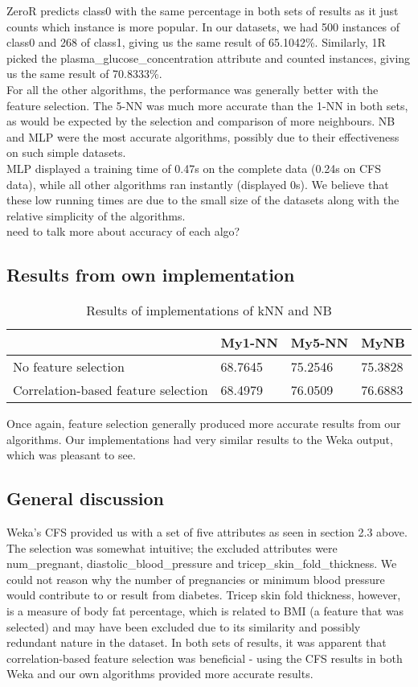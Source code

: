 \documentclass{article}
\begin{document}
ZeroR predicts class0 with the same percentage in both sets of results as it just counts which instance is more popular. In our datasets, we had 500 instances of class0 and 268 of class1, giving us the same result of 65.1042\%. Similarly, 1R picked the plasma\_glucose\_concentration attribute and counted instances, giving us the same result of 70.8333\%. \\
For all the other algorithms, the performance was generally better with the feature selection. The 5-NN was much more accurate than the 1-NN in both sets, as would be expected by the selection and comparison of more neighbours. NB and MLP were the most accurate algorithms, possibly due to their effectiveness on such simple datasets.  \\
MLP displayed a training time of 0.47s on the complete data (0.24s on CFS data), while all other algorithms ran instantly (displayed 0s). We believe that these low running times are due to the small size of the datasets along with the relative simplicity of the algorithms.  \\

need to talk more about accuracy of each algo? 

\subsection{Results from own implementation}
\begin{table}[h]
\centering
\begin{tabular}{@{}llll@{}}
\hline
 									& My1-NN & My5-NN & MyNB \\ \hline
No feature selection 					& 68.7645 & 75.2546 & 75.3828 \\
Correlation-based feature selection 	& 68.4979 & 76.0509 & 76.6883 \\ \hline
\end{tabular}
\caption {Results of implementations of kNN and NB}
\end{table}

Once again, feature selection generally produced more accurate results from our algorithms. Our implementations had very similar results to the Weka output, which was pleasant to see. 

\subsection{General discussion}
Weka's CFS provided us with a set of five attributes as seen in section 2.3 above. The selection was somewhat intuitive; the excluded attributes were num\_pregnant, diastolic\_blood\_pressure and tricep\_skin\_fold\_thickness. We could not reason why the number of pregnancies or minimum blood pressure would contribute to or result from diabetes. Tricep skin fold thickness, however, is a measure of body fat percentage, which is related to BMI (a feature that was selected) and may have been excluded due to its similarity and possibly redundant nature in the dataset.
In both sets of results, it was apparent that correlation-based feature selection was beneficial - using the CFS results in both Weka and our own algorithms provided more accurate results.  \\
\end{document}
